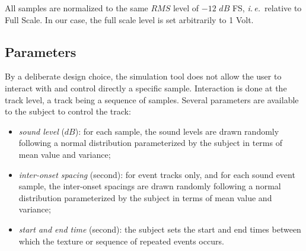 \documentclass[12pt]{elsarticle}
\newcommand{\ie}{\emph{i.\,e.}}
\begin{document}

All samples are normalized to the same $RMS$ level of $-12$ $dB$ FS, \ie~relative to Full Scale. In our case, the full scale level is set arbitrarily to 1 Volt.

\subsection{Parameters}
\label{sec:simscene_parametre}


By a deliberate design choice, the simulation tool does not allow the user to interact with and control directly a specific sample. Interaction is done at the track level, a track being a sequence of samples. Several parameters are available to the subject to control the track:


 \begin{itemize} 
\item \emph{sound level} ($dB$): for each sample, the sound levels are drawn randomly following a normal distribution parameterized by the subject in terms of mean value and variance;
\item \emph{inter-onset spacing} (second): for event tracks only, and for each sound event sample, the inter-onset spacings are drawn randomly following a normal distribution parameterized by the subject in terms of mean value and variance;
\item \emph{start and end time} (second): the subject sets the start and end times between which the texture or sequence of repeated events occurs.
 \end{itemize} 
\end{document}
